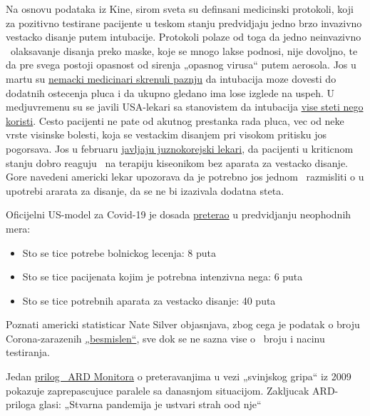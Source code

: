 Na osnovu podataka iz Kine, sirom sveta su definsani medicinski
protokoli, koji za pozitivno testirane pacijente u teskom stanju
predvidjaju jedno brzo invazivno vestacko disanje putem intubacije.
Protokoli polaze od toga da jedno neinvazivno ~olaksavanje disanja preko
maske, koje se mnogo lakse podnosi, nije dovoljno, te da pre svega
postoji opasnost od sirenja „opasnog virusa`` putem aerosola. Jos u
martu su
\href{https://www.doccheck.com/de/detail/articles/26271-covid-19-beatmung-und-dann}{nemacki
medicinari skrenuli paznju} da intubacija moze dovesti do dodatnih
ostecenja pluca i da ukupno gledano ima lose izglede na uspeh. U
medjuvremenu su se javili USA-lekari sa stanovistem da intubacija
\href{https://www.youtube.com/watch?v=k9GYTc53r2o}{vise steti nego
koristi}. Cesto pacijenti ne pate od akutnog prestanka rada pluca, vec
od neke vrste visinske bolesti, koja se vestackim disanjem pri visokom
pritisku jos pogorsava. Jos u februaru
\href{https://www.upi.com/Top_News/World-News/2020/02/14/Oxygen-therapy-working-for-coronavirus-patient-Seoul-says/6651581696794/}{javljaju
juznokorejski lekari}, da pacijenti u kriticnom stanju dobro reaguju ~na
terapiju kiseonikom bez aparata za vestacko disanje. Gore navedeni
americki lekar upozorava da je potrebno jos jednom ~razmisliti o u
upotrebi ararata za disanje, da se ne bi izazivala dodatna steta.

Oficijelni US-model za Covid-19 je dosada
\href{https://mail.protonmail.com/\#COVID19\%20Projections\%20(https://covid19.healthdata.org/projections}{preterao}
u predvidjanju neophodnih mera:

\begin{itemize}
\tightlist
\item
  Sto se tice potrebe bolnickog lecenja: 8 puta
\item
  Sto se tice pacijenata kojim je potrebna intenzivna nega: 6 puta
\item
  Sto se tice potrebnih aparata za vestacko disanje: 40 puta
\end{itemize}

Poznati americki statisticar Nate Silver objasnjava, zbog cega je
podatak o broju Corona-zarazenih
\href{https://fivethirtyeight.com/features/coronavirus-case-counts-are-meaningless/}{„besmislen``},
sve dok se ne sazna vise o~ broju i nacinu testiranja.

Jedan \href{https://vimeo.com/403175258}{prilog ~ARD Monitora} o
preteravanjima u vezi „svinjskog gripa`` iz 2009 pokazuje zaprepascujuce
paralele sa danasnjom situacijom. Zakljucak ARD-priloga glasi: „Stvarna
pandemija je ustvari strah ood nje``

